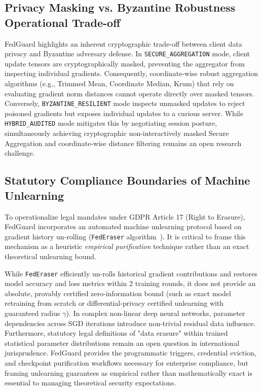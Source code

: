 \subsection{Privacy Masking vs. Byzantine Robustness Operational Trade-off}

FedGuard highlights an inherent cryptographic trade-off between client data privacy and Byzantine adversary defense. In \texttt{SECURE\_AGGREGATION} mode, client update tensors are cryptographically masked, preventing the aggregator from inspecting individual gradients. Consequently, coordinate-wise robust aggregation algorithms (e.g., Trimmed Mean, Coordinate Median, Krum) that rely on evaluating gradient norm distances cannot operate directly over masked tensors. Conversely, \texttt{BYZANTINE\_RESILIENT} mode inspects unmasked updates to reject poisoned gradients but exposes individual updates to a curious server. While \texttt{HYBRID\_AUDITED} mode mitigates this by negotiating session posture, simultaneously achieving cryptographic non-interactively masked Secure Aggregation and coordinate-wise distance filtering remains an open research challenge.

\subsection{Statutory Compliance Boundaries of Machine Unlearning}

To operationalize legal mandates under GDPR Article 17 (Right to Erasure), FedGuard incorporates an automated machine unlearning protocol based on gradient history un-rolling (\texttt{FedEraser} algorithm~\cite{liu2021federaser}). It is critical to frame this mechanism as a heuristic \emph{empirical purification} technique rather than an exact theoretical unlearning bound.

While \texttt{FedEraser} efficiently un-rolls historical gradient contributions and restores model accuracy and loss metrics within 2 training rounds, it does not provide an absolute, provably certified zero-information bound (such as exact model retraining from scratch or differential-privacy certified unlearning with guaranteed radius $\gamma$). In complex non-linear deep neural networks, parameter dependencies across SGD iterations introduce non-trivial residual data influence. Furthermore, statutory legal definitions of "data erasure" within trained statistical parameter distributions remain an open question in international jurisprudence. FedGuard provides the programmatic triggers, credential eviction, and checkpoint purification workflows necessary for enterprise compliance, but framing unlearning guarantees as empirical rather than mathematically exact is essential to managing theoretical security expectations.

